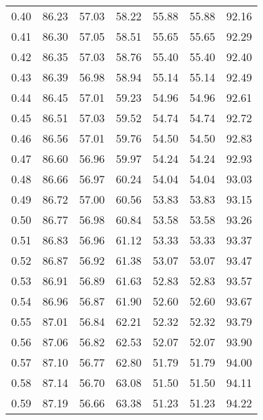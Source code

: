 \begin{tabular}{|c|c|c|c|c|c|c|}
      0.40 &     86.23 &     57.03 &      58.22 &   55.88 &      55.88 &         92.16 \\
      0.41 &     86.30 &     57.05 &      58.51 &   55.65 &      55.65 &         92.29 \\
      0.42 &     86.35 &     57.03 &      58.76 &   55.40 &      55.40 &         92.40 \\
      0.43 &     86.39 &     56.98 &      58.94 &   55.14 &      55.14 &         92.49 \\
      0.44 &     86.45 &     57.01 &      59.23 &   54.96 &      54.96 &         92.61 \\
      0.45 &     86.51 &     57.03 &      59.52 &   54.74 &      54.74 &         92.72 \\
      0.46 &     86.56 &     57.01 &      59.76 &   54.50 &      54.50 &         92.83 \\
      0.47 &     86.60 &     56.96 &      59.97 &   54.24 &      54.24 &         92.93 \\
      0.48 &     86.66 &     56.97 &      60.24 &   54.04 &      54.04 &         93.03 \\
      0.49 &     86.72 &     57.00 &      60.56 &   53.83 &      53.83 &         93.15 \\
      0.50 &     86.77 &     56.98 &      60.84 &   53.58 &      53.58 &         93.26 \\
      0.51 &     86.83 &     56.96 &      61.12 &   53.33 &      53.33 &         93.37 \\
      0.52 &     86.87 &     56.92 &      61.38 &   53.07 &      53.07 &         93.47 \\
      0.53 &     86.91 &     56.89 &      61.63 &   52.83 &      52.83 &         93.57 \\
      0.54 &     86.96 &     56.87 &      61.90 &   52.60 &      52.60 &         93.67 \\
      0.55 &     87.01 &     56.84 &      62.21 &   52.32 &      52.32 &         93.79 \\
      0.56 &     87.06 &     56.82 &      62.53 &   52.07 &      52.07 &         93.90 \\
      0.57 &     87.10 &     56.77 &      62.80 &   51.79 &      51.79 &         94.00 \\
      0.58 &     87.14 &     56.70 &      63.08 &   51.50 &      51.50 &         94.11 \\
      0.59 &     87.19 &     56.66 &      63.38 &   51.23 &      51.23 &         94.22 \\

\end{tabular}
